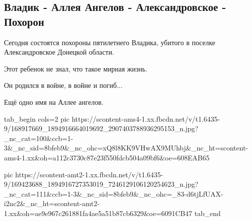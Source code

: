  
 
 
 
 

\subsection{Владик - Аллея Ангелов - Александровское - Похорон}

Сегодня состоятся похороны пятилетнего Владика, убитого в поселке Александровское Донецкой области.

Этот ребенок не знал, что такое мирная жизнь. 

Он родился в войне, в войне и погиб...

Ещё одно имя на Аллее ангелов.

\ifcmt
  tab_begin cols=2
    pic https://scontent-ams4-1.xx.fbcdn.net/v/t1.6435-9/168917669_1894916664019692_2907403788936295153_n.jpg?_nc_cat=100&ccb=1-3&_nc_sid=8bfeb9&_nc_ohc=xQ8l8KK9VHwAX9MUhbj&_nc_ht=scontent-ams4-1.xx&oh=a112c3730c87e23f550fdcb504a09bf6&oe=608EAB65

    pic https://scontent-amt2-1.xx.fbcdn.net/v/t1.6435-9/169423688_1894916727353019_7246129106120254623_n.jpg?_nc_cat=111&ccb=1-3&_nc_sid=8bfeb9&_nc_ohc=_83-d6tjLfUAX-i2nc2&_nc_ht=scontent-amt2-1.xx&oh=ae9e967c261881fa4ae5a51b87cb6329&oe=6091CB47
  tab_end
\fi

